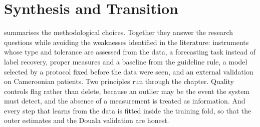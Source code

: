 \documentclass[11pt,a4paper,oneside]{report}
\begin{document}
\section{Synthesis and Transition}\label{sec:meth-synthesis}

 summarises the methodological choices. Together they answer the research questions while avoiding the weaknesses identified in the literature: instruments whose type and tolerance are assessed from the data, a forecasting task instead of label recovery, proper measures and a baseline from the guideline rule, a model selected by a protocol fixed before the data were seen, and an external validation on Cameroonian patients. Two principles run through the chapter. Quality controls flag rather than delete, because an outlier may be the event the system must detect, and the absence of a measurement is treated as information. And every step that learns from the data is fitted inside the training fold, so that the outer estimates and the Douala validation are honest.
\end{document}
